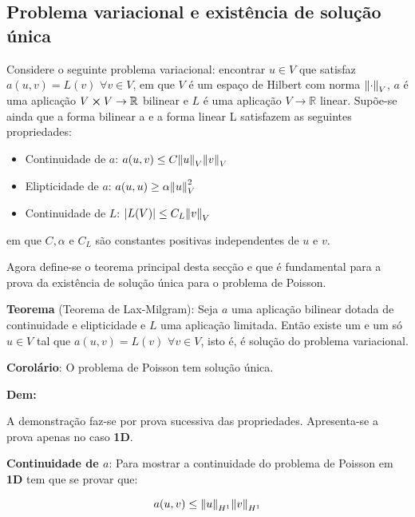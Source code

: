 \documentclass{article}
\newcommand{\R}{\mathbb{R}}
\theoremstyle{definition}
\theoremstyle{plain}
\numberwithin{equation}{section}
\newcommand{\tab}{\hspace{10mm}}
\begin{document}
\subsection{Problema variacional e existência de solução única}
\label{sec:7.3}
\tab Considere o seguinte problema variacional: encontrar $u \in V$  que satisfaz $a(u,v) = L(v) $ $\forall v \in V$, em que $V$ é um espaço de Hilbert com norma $\norm{\cdot}_V$, $a$ é uma aplicação $V \cross V \to \R$  bilinear e $L$ é uma aplicação $V \to \R$ linear. Supõe-se ainda que a forma bilinear a e a forma linear L satisfazem as seguintes propriedades:
\vspace{3mm}
\begin{itemize}
    \item Continuidade de $a$: $a(u,v)\leq C\norm{u}_V\norm{v}_V$
    \item Elipticidade de $a$: $a(u,u)\geq \alpha\norm{u}^2_V$
    \item Continuidade de $L$: $|L(V)|\leq C_L\norm{v}_V$
\end{itemize}
\vspace{3mm}
em que $C, \alpha$ e $C_L$ são constantes positivas independentes de $u$ e $v$. 

\tab Agora define-se o teorema principal desta secção e que é fundamental para a prova da existência de solução única para o problema de Poisson.

\vspace{1mm}

\textbf{Teorema} (Teorema de Lax-Milgram): Seja $a$ uma aplicação bilinear dotada de continuidade e elipticidade e $L$ uma aplicação limitada. Então existe um e um só $u \in V$ tal que $a(u,v) = L(v) $ $\forall v \in V$, isto é, é solução do problema variacional.

\vspace{1mm}

\textbf{Corolário}: O problema de Poisson tem solução única.

\vspace{1mm}

\textbf{Dem:}

\vspace{1mm}
A demonstração faz-se por prova sucessiva das propriedades. Apresenta-se a prova apenas no caso \textbf{1D}.

\textbf{Continuidade de $a$}: Para mostrar a continuidade do problema de Poisson em \textbf{1D} tem que se provar que:

\begin{equation*}
    a(u,v) \leq \norm{u}_{H^1}\norm{v}_{H^1}
\end{equation*}
\end{document}
